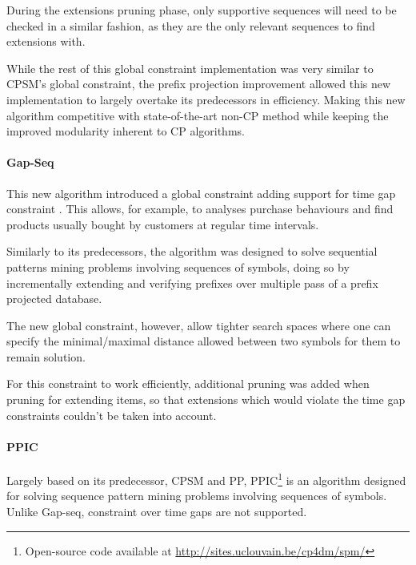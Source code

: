 \documentclass{eplmastersthesis}
\begin{document}
During the extensions pruning phase, only supportive sequences will need to be checked in a similar fashion, as they are the only relevant sequences to find extensions with. \newline

While the rest of this global constraint implementation was very similar to CPSM's global constraint, the prefix projection improvement allowed this new implementation to largely overtake its predecessors in efficiency. Making this new algorithm competitive with state-of-the-art non-CP method while keeping the improved modularity inherent to CP algorithms.

\paragraph{Gap-Seq}

This new algorithm introduced a global constraint adding support for time gap constraint \cite{kemmar2016global}. This allows, for example, to analyses purchase behaviours and find products usually bought by customers at regular time intervals. \newline

Similarly to its predecessors, the algorithm was designed to solve sequential patterns mining problems involving sequences of symbols, doing so by incrementally extending and verifying prefixes over multiple pass of a prefix projected database. \newline

The new global constraint, however, allow tighter search spaces where one can specify the minimal/maximal distance allowed between two symbols for them to remain solution. \newline

For this constraint to work efficiently, additional pruning was added when pruning for extending items, so that extensions which would violate the time gap constraints couldn't be taken into account.

\paragraph{PPIC}

Largely based on its predecessor, CPSM and PP, PPIC\footnote{Open-source code available at \url{http://sites.uclouvain.be/cp4dm/spm/}} is an algorithm designed for solving sequence pattern mining problems involving sequences of symbols. Unlike Gap-seq, constraint over time gaps are not supported. \newline
\end{document}
